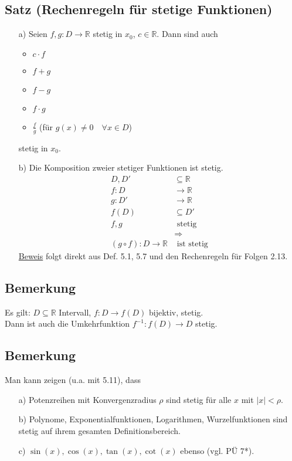\documentclass[12pt, titlepage]{article}
\newcommand{\R}{\mathds{R}}
\renewcommand{\*}{\cdot}
\begin{document}
	\subsection{Satz (Rechenregeln für stetige Funktionen)}
	\begin{itemize}
		\item[a)] Seien $f, g\colon D\rightarrow\R$ stetig in $x_0$, $c\in\R$. Dann sind auch
		\begin{itemize}
			\item $c\* f$
			\item $f+g$
			\item $f-g$
			\item $f\* g$
			\item $\frac{f}{g}$ (für $g(x)\neq 0\quad\forall x\in D$)
		\end{itemize}
		stetig in $x_0$.
		\item[b)] Die Komposition zweier stetiger Funktionen ist stetig.
		\begin{align*}
			D,D'&\subseteq\R\\
			f\colon D&\rightarrow\R\\
			g\colon D'&\rightarrow\R\\
			f(D)&\subseteq D'\\
			f,g&\textrm{ stetig}\\
			&\Rightarrow\\
			(g\circ f)\colon D\rightarrow\R&\textrm{ ist stetig}
		\end{align*}
		\underline{Beweis} folgt direkt aus Def. 5.1, 5.7 und den Rechenregeln für Folgen 2.13.
	\end{itemize}
	\subsection{Bemerkung}
	Es gilt: $D\subseteq\R$ Intervall, $f\colon D\rightarrow f(D)$ bijektiv, stetig.\\
	Dann ist auch die Umkehrfunktion $f^{-1}\colon f(D)\rightarrow D$ stetig.
	\subsection{Bemerkung}
	Man kann zeigen (u.a. mit 5.11), dass
	\begin{itemize}
		\item[a)] Potenzreihen mit Konvergenzradius $\rho$ sind stetig für alle $x$ mit $|x|<\rho$.
		\item[b)] Polynome, Exponentialfunktionen, Logarithmen, Wurzelfunktionen sind stetig auf ihrem gesamten Definitionsbereich.
		\item[c)] $\sin(x), \cos(x), \tan(x), \cot(x)$ ebenso (vgl. PÜ 7*).
	\end{itemize}
\end{document}
